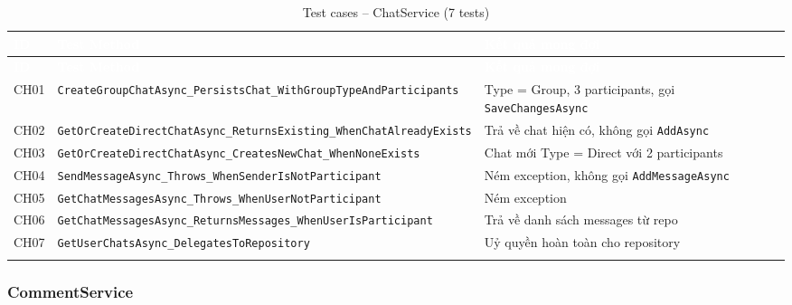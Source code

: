 \documentclass[a4paper]{article}
\begin{document}
\begin{longtable}{|C{0.8cm}|L{5.4cm}|L{7.4cm}|}
\hline
{}
\textcolor{white}{\textbf{ID}} &
\textcolor{white}{\textbf{Test Method}} &
\textcolor{white}{\textbf{Kết quả mong đợi}} \\
\hline
\endfirsthead
\hline
{}
\textcolor{white}{\textbf{ID}} &
\textcolor{white}{\textbf{Test Method}} &
\textcolor{white}{\textbf{Kết quả mong đợi}} \\
\hline
\endhead
\hline
\endfoot

CH01 & \texttt{CreateGroupChatAsync\_PersistsChat\_WithGroupTypeAndParticipants} & Type = Group, 3 participants, gọi \texttt{SaveChangesAsync} \\
\hline
CH02 & \texttt{GetOrCreateDirectChatAsync\_ReturnsExisting\_WhenChatAlreadyExists} & Trả về chat hiện có, không gọi \texttt{AddAsync} \\
\hline
{}
CH03 & \texttt{GetOrCreateDirectChatAsync\_CreatesNewChat\_WhenNoneExists} & Chat mới Type = Direct với 2 participants \\
\hline
CH04 & \texttt{SendMessageAsync\_Throws\_WhenSenderIsNotParticipant} & Ném exception, không gọi \texttt{AddMessageAsync} \\
\hline
{}
CH05 & \texttt{GetChatMessagesAsync\_Throws\_WhenUserNotParticipant} & Ném exception \\
\hline
CH06 & \texttt{GetChatMessagesAsync\_ReturnsMessages\_WhenUserIsParticipant} & Trả về danh sách messages từ repo \\
\hline
{}
CH07 & \texttt{GetUserChatsAsync\_DelegatesToRepository} & Uỷ quyền hoàn toàn cho repository \\
\hline
\caption{Test cases -- ChatService (7 tests)}
\end{longtable}

\subsubsection{CommentService}
\end{document}
